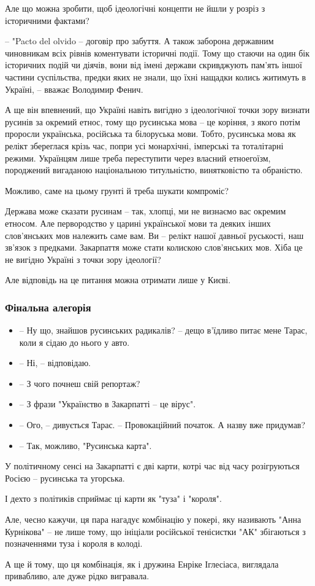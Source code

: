 Але що можна зробити, щоб ідеологічні концепти не йшли у розріз з історичними
фактами?

– "Pacto del olvido – договір про забуття. А також заборона державним
чиновникам всіх рівнів коментувати історичні події. Тому що стаючи на один бік
історичних подій чи діячів, вони від імені держави скривджують пам'ять іншої
частини суспільства, предки яких не знали, що їхні нащадки колись житимуть в
Україні, – вважає Володимир Фенич.

А ще він впевнений, що Україні навіть вигідно з ідеологічної точки зору визнати
русинів за окремий етнос, тому що русинська мова – це коріння, з якого потім
проросли українська, російська та білоруська мови. Тобто, русинська мова як
релікт збереглася крізь час, попри усі монархічні, імперські та тоталітарні
режими. Українцям лише треба переступити через власний етноегоїзм, породжений
вигаданою національною титульністю, винятковістю та обраністю.

Можливо, саме на цьому грунті й треба шукати компроміс?

Держава може сказати русинам – так, хлопці, ми не визнаємо вас окремим етносом.
Але первородство у царині української мови та деяких інших слов’янських мов
належить саме вам. Ви – релікт нашої давньої руськості, наш зв'язок з предками.
Закарпаття може стати колискою слов’янських мов. Хіба це не вигідно Україні з
точки зору ідеології?

Але відповідь на це питання можна отримати лише у Києві.

\subsubsection{Фінальна алегорія}

\begin{itemize}
  \item – Ну що, знайшов русинських радикалів? – дещо в’їдливо питає мене Тарас, коли я сідаю до нього у авто.
  \item – Ні, – відповідаю.
  \item – З чого почнеш свій репортаж?
  \item – З фрази "Українство в Закарпатті – це вірус".
  \item – Ого, – дивується Тарас. – Провокаційний початок. А назву вже придумав?
  \item – Так, можливо, "Русинська карта".
\end{itemize}

У політичному сенсі на Закарпатті є дві карти, котрі час від часу розігруються
Росією – русинська та угорська.

І дехто з політиків сприймає ці карти як "туза" і "короля".

Але, чесно кажучи, ця пара нагадує комбінацію у покері, яку називають "Анна
Курнікова" – не лише тому, що ініціали російської тенісистки "АК" збігаються з
позначеннями туза і короля в колоді.

А ще й тому, що ця комбінація, як і дружина Енріке Іглесіаса, виглядала
привабливо, але дуже рідко вигравала.
